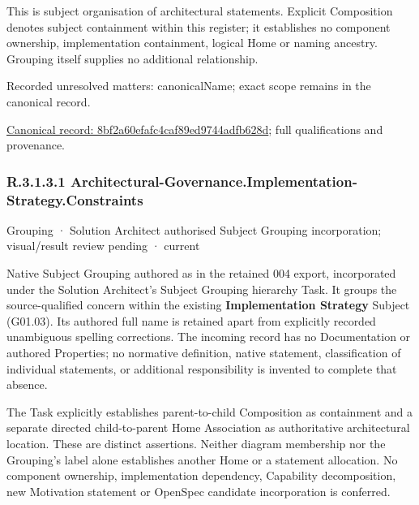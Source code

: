 This is subject organisation of architectural statements. Explicit Composition denotes subject containment within this register; it establishes no component ownership, implementation containment, logical Home or naming ancestry. Grouping itself supplies no additional relationship.


{\small Recorded unresolved matters: canonicalName; exact scope remains in the canonical record.}\par
{\footnotesize \href{../../../../continuum/grouping/8bf2a60efafc4caf89ed9744adfb628d.md}{Canonical record: 8bf2a60efafc4caf89ed9744adfb628d}; full qualifications and provenance.}\par
\subsubsection*{R.3.1.3.1 Architectural-Governance.Implementation-Strategy.Constraints}
\label{navigation:R.3.1.3.1}

\label{element:549a5d805b3f40d49437ce704f923bf0}
{\small Grouping · Solution Architect authorised Subject Grouping incorporation; visual/result review pending · current}\par

Native Subject Grouping authored as \texttt{} in the retained 004 export,
incorporated under the Solution Architect's Subject Grouping hierarchy Task.
It groups the source-qualified \texttt{} concern within
the existing \textbf{Implementation Strategy} Subject (G01.03). Its authored full name
is retained apart from explicitly recorded unambiguous spelling corrections.
The incoming record has no Documentation or authored Properties; no normative
definition, native statement, classification of individual statements, or
additional responsibility is invented to complete that absence.



The Task explicitly establishes parent-to-child Composition as containment and
a separate directed child-to-parent Home Association as authoritative architectural
location. These are distinct assertions. Neither diagram membership nor the
Grouping's label alone establishes another Home or a statement allocation.
No component ownership, implementation dependency, Capability decomposition,
new Motivation statement or OpenSpec candidate incorporation is conferred.



